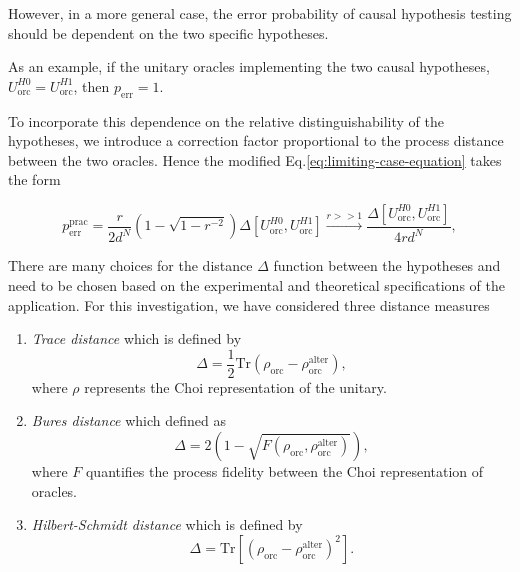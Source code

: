 \documentclass[%
 aps,
 jmp,%
 amsmath,amssymb,
 reprint,%
]{revtex4-2}
\begin{document}
However, in a more general case, the error probability of causal hypothesis testing should be dependent on the two specific hypotheses.

As an example, if the unitary oracles implementing the two causal hypotheses, $U_\textrm{orc}^{H0} = U_\textrm{orc}^{H1}$, then $p_\textrm{err} =1$.

To incorporate this dependence on the relative distinguishability of the hypotheses, we introduce a correction factor proportional to the process distance between the two oracles. 
Hence the modified Eq.\eqref{eq:limiting-case-equation} takes the form
\begin{widetext}
\begin{equation}
p_\textrm{err}^\textrm{prac} = \frac{r}{2d^N}\left( 1-\sqrt{1-r^{-2}} \right)\Delta\left[U_\textrm{orc}^{H0}, U_\textrm{orc}^{H1}\right] \xrightarrow[]{r>>1}\frac{\Delta\left[U_\textrm{orc}^{H0}, U_\textrm{orc}^{H1}\right]}{4rd^N},\label{eq:practical-case-equation}
\end{equation}
\end{widetext}

There are many choices for the distance $\Delta$ function between the hypotheses and need to be chosen based on the experimental and theoretical specifications of the application. 
For this investigation, we have considered three distance measures
\begin{enumerate}
	\item \textit{Trace distance} which is defined by 
	\begin{equation}
	\Delta = \frac{1}{2}\textrm{Tr}\left(\rho_\textrm{orc}-\rho_\textrm{orc}^\textrm{alter}\right),
	\end{equation}
	where $\rho$ represents the Choi representation of the unitary.
	\item \textit{Bures distance} which defined as 
	\begin{equation}
	\Delta = 2\left(1-\sqrt{F(\rho_\textrm{orc},\rho_\textrm{orc}^\textrm{alter})}\right),
	\end{equation}
	where $F$ quantifies the process fidelity between the Choi representation of oracles.
	\item \textit{Hilbert-Schmidt distance} which is defined by
\begin{equation}
	\Delta = \textrm{Tr}\left[\left(\rho_\textrm{orc} - \rho_\textrm{orc}^\textrm{alter}\right)^2\right].
\end{equation}
\end{enumerate}
\end{document}
